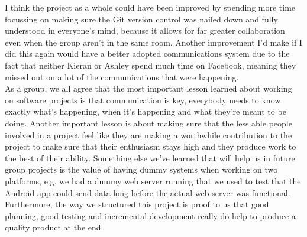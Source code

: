 \documentclass{article}
\begin{document}
		I think the project as a whole could have been improved by spending more time focussing on making sure the Git version control was nailed down and fully understood in everyone’s mind, because it allows for far greater collaboration even when the group aren't in the same room. Another improvement I’d make if I did this again would have a better adopted communications system due to the fact that neither Kieran or Ashley spend much time on Facebook, meaning they missed out on a lot of the communications that were happening. \\

		As a group, we all agree that the most important lesson learned about working on software projects is that communication is key, everybody needs to know exactly what's happening, when it's happening and what they're meant to be doing. Another important lesson is about making sure that the less able people involved in a project feel like they are making a worthwhile contribution to the project to make sure that their enthusiasm stays high and they produce work to the best of their ability. Something else we've learned that will help us in future group projects is the value of having dummy systems when working on two platforms, e.g. we had a dummy web server running that we used to test that the Android app could send data long before the actual web server was functional. Furthermore, the way we structured this project is proof to us that good planning, good testing and incremental development really do help to produce a quality product at the end.
	
\end{document}
